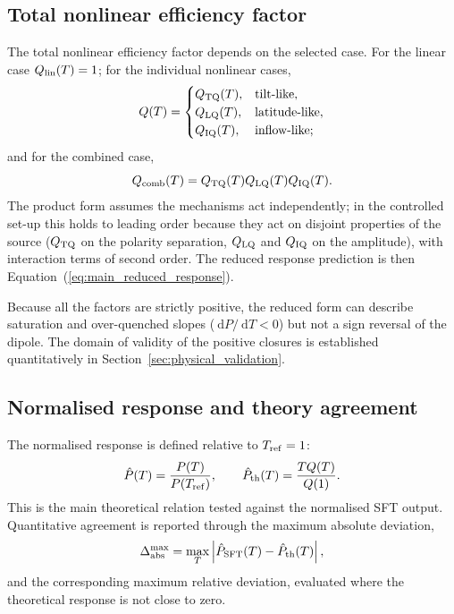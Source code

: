 \documentclass[namedreferences,hyperref,optionalrh,solaromanenum]{spr-sola}
\newcommand{\rmd}{{\ \mathrm d}}
\begin{document}
\subsection{Total nonlinear efficiency factor}
\label{subsec:total_Q}

The total nonlinear efficiency factor depends on the selected case. For
the linear case $Q_{\rm lin}(T)=1$; for the individual nonlinear cases,
%
\begin{equation}
Q(T)=
\begin{cases}
Q_{\rm TQ}(T), & \mathrm{tilt\text{-}like},\\
Q_{\rm LQ}(T), & \mathrm{latitude\text{-}like},\\
Q_{\rm IQ}(T), & \mathrm{inflow\text{-}like};
\end{cases}
\label{eq:individual_Q}
\end{equation}
%
and for the combined case,
%
\begin{equation}
Q_{\rm comb}(T)
=
Q_{\rm TQ}(T)
Q_{\rm LQ}(T)
Q_{\rm IQ}(T).
\label{eq:Qcombined}
\end{equation}
%
The product form assumes the mechanisms act independently; in the
controlled set-up this holds to leading order because they act on disjoint
properties of the source ($Q_{\rm TQ}$ on the polarity separation,
$Q_{\rm LQ}$ and $Q_{\rm IQ}$ on the amplitude), with interaction terms of
second order. The reduced response prediction is then
Equation~(\ref{eq:main_reduced_response}).

Because all the factors are strictly positive, the reduced form can
describe saturation and over-quenched slopes ($\rmd P/\rmd T<0$) but not a
sign reversal of the dipole. The domain of validity of the positive
closures is established quantitatively in
Section~\ref{sec:physical_validation}.

\subsection{Normalised response and theory agreement}
\label{subsec:normalized_response}

The normalised response is defined relative to $T_{\rm ref}=1$:
%
\begin{equation}
\hat{P}(T)
=
\frac{P(T)}{P(T_{\rm ref})},
\qquad
\hat{P}_{\rm th}(T)
=
\frac{TQ(T)}{Q(1)}.
\label{eq:Phat_def}
\end{equation}
%
This is the main theoretical relation tested against the normalised SFT
output. Quantitative agreement is reported through the maximum absolute
deviation,
%
\begin{equation}
\Delta_{\rm abs}^{\rm max}
=
\max_T
\left|
\hat{P}_{\rm SFT}(T)-\hat{P}_{\rm th}(T)
\right|,
\label{eq:max_abs_deviation}
\end{equation}
%
and the corresponding maximum relative deviation, evaluated where the
theoretical response is not close to zero.
\end{document}
